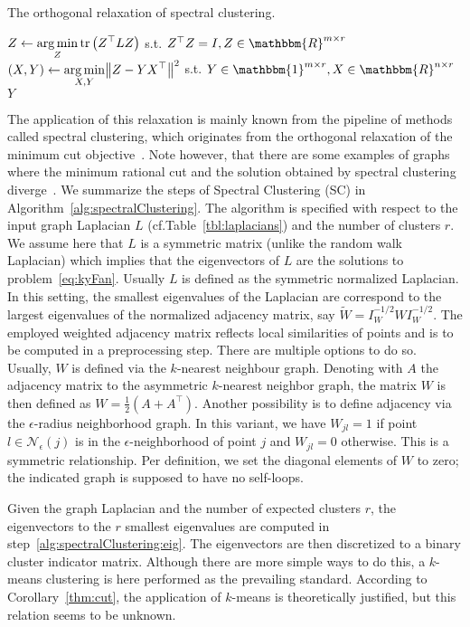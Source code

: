 \begin{algorithm}[t]
\caption{The orthogonal relaxation of spectral clustering.} 
\begin{algorithmic}[1]
   
  \State $\displaystyle Z\gets \operatorname*{arg\,min}_{Z}\operatorname*{tr}\left(Z^\top LZ\right)$ s.t. $Z^\top Z=I, Z\in\mathbbm{R}^{m\times r}$ \label{alg:spectralClustering:eig}
  \State $\displaystyle (X,Y)\gets \operatorname*{arg\,min}_{X,Y}\bigl\lVert Z-YX^\top\bigr\rVert ^2$ s.t. $Y\in\mathbbm{1}^{m\times r}, X\in\mathbbm{R}^{n\times r}$ 
  \State \Return $Y$
  \EndFunction
\end{algorithmic}
\label{alg:spectralClustering}
\end{algorithm}
The application of this relaxation is mainly known from the pipeline of methods called spectral clustering, which originates from the orthogonal relaxation of the minimum cut objective~\citep{Luxburg2007tutorial}. Note however, that there are some examples of graphs where the minimum rational cut and the solution obtained by spectral clustering diverge~\citep{guattery1998quality}.  We summarize the steps of Spectral Clustering (SC) in Algorithm~\ref{alg:spectralClustering}. The algorithm is specified with respect to the input graph Laplacian $L$ (cf.\@ Table~\ref{tbl:laplacians}) and the number of clusters $r$. We assume here that $L$ is a symmetric matrix (unlike the random walk Laplacian) which implies that the eigenvectors of $L$ are the solutions to problem~\eqref{eq:kyFan}. Usually $L$ is defined as the symmetric normalized Laplacian. In this setting, the smallest eigenvalues of the Laplacian are correspond to the largest eigenvalues of the normalized adjacency matrix, say $\tilde{W}=I_W^{-1/2}WI_W^{-1/2}$. The employed weighted adjacency matrix reflects local similarities of points and is to be computed in a preprocessing step. There are multiple options to do so. Usually, $W$ is defined via the $k$-nearest neighbour graph. Denoting with $A$ the adjacency matrix to the asymmetric $k$-nearest neighbor graph, the matrix $W$ is then defined as $W=\frac{1}{2}(A+A^\top)$. Another possibility is to define adjacency via the $\epsilon$-radius neighborhood graph. In this variant, we have $W_{jl}=1$ if point $l\in\mathcal{N}_\epsilon(j)$ is in the $\epsilon$-neighborhood of point $j$ and $W_{jl}=0$ otherwise. This is a symmetric relationship. Per definition, we set the diagonal elements of $W$ to zero; the indicated graph is supposed to have no self-loops. 

Given the graph Laplacian and the number of expected clusters $r$, the eigenvectors to the $r$ smallest eigenvalues are computed in step~\ref{alg:spectralClustering:eig}. The eigenvectors are then discretized to a binary cluster indicator matrix. Although there are more simple ways to do this, a $k$-means clustering is here performed as the prevailing standard. According to Corollary~\ref{thm:cut}, the application of $k$-means is theoretically justified, but this relation seems to be unknown.

